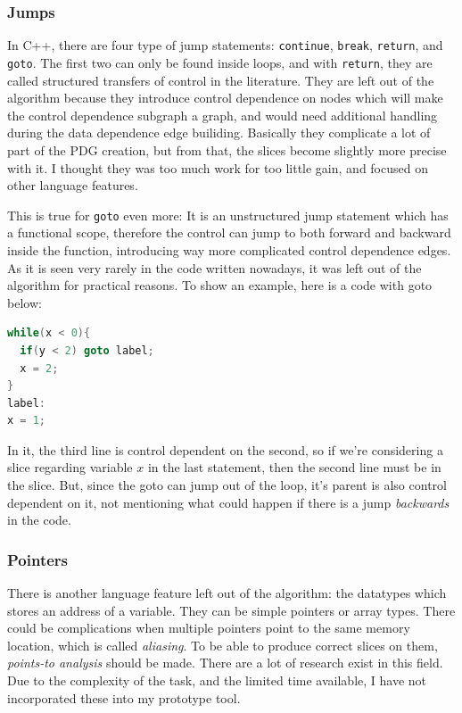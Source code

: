 \documentclass[oneside,12pt,a4paper]{book}
\begin{document}
\subsubsection{Jumps}

In C++, there are four type of jump statements: \texttt{continue}, \texttt{break}, \texttt{return}, and \texttt{goto}. The first two can only be found inside loops, and with \texttt{return}, they are called structured transfers of control in the literature. They are left out of the algorithm because they introduce control dependence on nodes which will make the control dependence subgraph a graph, and would need additional handling during the data dependence edge builiding. Basically they complicate a lot of part of the PDG creation, but from that, the slices become slightly more precise with it. I thought they was too much work for too little gain, and focused on other language features.

This is true for \texttt{goto} even more: It is an unstructured jump statement which has a functional scope, therefore the control can jump to both forward and backward inside the function, introducing way more complicated control dependence edges. As it is seen very rarely in the code written nowadays, it was left out of the algorithm for practical reasons. To show an example, here is a code with goto below:

\begin{lstlisting}[language=C++]
while(x < 0){
  if(y < 2) goto label; 
  x = 2;
}
label:
x = 1;
\end{lstlisting}

In it, the third line is control dependent on the second, so if we're considering a slice regarding variable $x$ in the last statement, then the second line must be in the slice. But, since the goto can jump out of the loop, it's parent is also control dependent on it, not mentioning what could happen if there is a jump \textit{backwards} in the code.

\subsubsection{Pointers}

There is another language feature left out of the algorithm: the datatypes which stores an address of a variable. They can be simple pointers or array types. There could be complications when multiple pointers point to the same memory location, which is called \textit{aliasing}. To be able to produce correct slices on them, \textit{points-to analysis} should be made. There are a lot of research exist in this field. Due to the complexity of the task, and the limited time available, I have not incorporated these into my prototype tool. 
\end{document}
